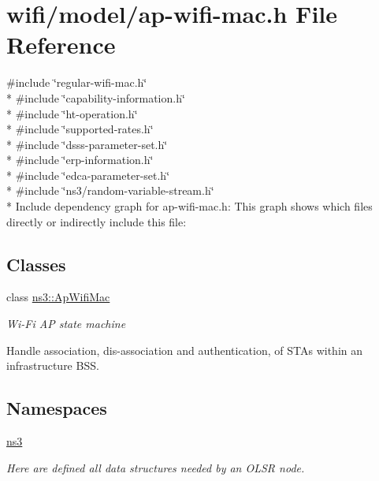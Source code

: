 \hypertarget{ap-wifi-mac_8h}{}\section{wifi/model/ap-\/wifi-\/mac.h File Reference}
\label{ap-wifi-mac_8h}
{\ttfamily \#include \char`\"{}regular-\/wifi-\/mac.\+h\char`\"{}}\\*
{\ttfamily \#include \char`\"{}capability-\/information.\+h\char`\"{}}\\*
{\ttfamily \#include \char`\"{}ht-\/operation.\+h\char`\"{}}\\*
{\ttfamily \#include \char`\"{}supported-\/rates.\+h\char`\"{}}\\*
{\ttfamily \#include \char`\"{}dsss-\/parameter-\/set.\+h\char`\"{}}\\*
{\ttfamily \#include \char`\"{}erp-\/information.\+h\char`\"{}}\\*
{\ttfamily \#include \char`\"{}edca-\/parameter-\/set.\+h\char`\"{}}\\*
{\ttfamily \#include \char`\"{}ns3/random-\/variable-\/stream.\+h\char`\"{}}\\*
Include dependency graph for ap-\/wifi-\/mac.h\+:
This graph shows which files directly or indirectly include this file\+:
\subsection*{Classes}
\begin{DoxyCompactItemize}
\item 
class \hyperlink{classns3_1_1ApWifiMac}{ns3\+::\+Ap\+Wifi\+Mac}
\begin{DoxyCompactList}\small\item\em Wi-\/\+Fi AP state machine

Handle association, dis-\/association and authentication, of S\+T\+As within an infrastructure B\+SS. \end{DoxyCompactList}\end{DoxyCompactItemize}
\subsection*{Namespaces}
\begin{DoxyCompactItemize}
\item 
 \hyperlink{namespacens3}{ns3}
\begin{DoxyCompactList}\small\item\em Here are defined all data structures needed by an O\+L\+SR node. \end{DoxyCompactList}\end{DoxyCompactItemize}

